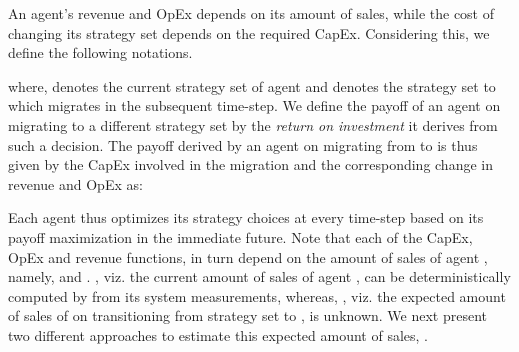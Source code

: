 \documentclass[smallextended]{svjour3}
\begin{document}
\par An agent's revenue and OpEx depends on its amount of sales, while the cost of
changing its strategy set depends on the required CapEx. Considering
this, we define the following notations.

where,  denotes the current strategy set of agent  and 
denotes the strategy set to which  migrates in the subsequent
time-step. We define the payoff of an agent on migrating to a different strategy set by the \emph{return on investment} it derives from such a decision. The payoff derived by an agent on migrating from  to
 is thus given by the CapEx involved in the migration and the
corresponding change in revenue and OpEx as:



\par Each agent thus optimizes its strategy choices at every time-step based on
its payoff maximization in the immediate future. Note that each of the CapEx,
OpEx and revenue functions, in turn depend on the amount of sales of agent
, namely,  and . , viz. the current
amount of sales of agent , can be deterministically computed by  from
its system measurements, whereas, , viz. the expected
amount of sales of  on transitioning from strategy set  to ,
is unknown. We next present two different approaches to estimate this expected
amount of sales, .
\end{document}

